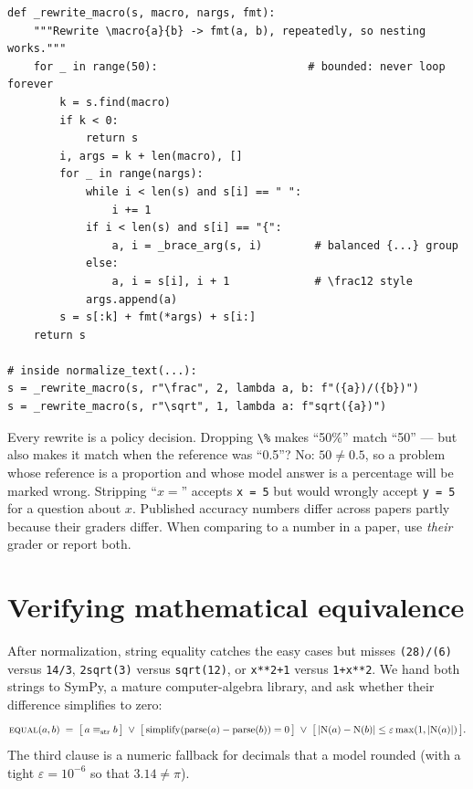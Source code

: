 \begin{lstlisting}[caption={Rewriting macros with brace-delimited arguments (excerpt).},label={lst:eval:rewrite}]
def _rewrite_macro(s, macro, nargs, fmt):
    """Rewrite \macro{a}{b} -> fmt(a, b), repeatedly, so nesting works."""
    for _ in range(50):                       # bounded: never loop forever
        k = s.find(macro)
        if k < 0:
            return s
        i, args = k + len(macro), []
        for _ in range(nargs):
            while i < len(s) and s[i] == " ":
                i += 1
            if i < len(s) and s[i] == "{":
                a, i = _brace_arg(s, i)        # balanced {...} group
            else:
                a, i = s[i], i + 1             # \frac12 style
            args.append(a)
        s = s[:k] + fmt(*args) + s[i:]
    return s

# inside normalize_text(...):
s = _rewrite_macro(s, r"\frac", 2, lambda a, b: f"({a})/({b})")
s = _rewrite_macro(s, r"\sqrt", 1, lambda a: f"sqrt({a})")
\end{lstlisting}

\begin{pitfall}
Every rewrite is a policy decision. Dropping \texttt{\textbackslash\%} makes ``50\%'' match
``50'' --- but also makes it match when the reference was ``0.5''? No: $50 \ne 0.5$, so a
problem whose reference is a proportion and whose model answer is a percentage will be marked
wrong. Stripping ``$x=$'' accepts \texttt{x = 5} but would wrongly accept \texttt{y = 5} for a
question about $x$. Published accuracy numbers differ across papers partly because their graders
differ. When comparing to a number in a paper, use \emph{their} grader or report both.
\end{pitfall}

\section{Verifying mathematical equivalence}\label{sec:eval:sympy}


After normalization, string equality catches the easy cases but misses \texttt{(28)/(6)} versus
\texttt{14/3}, \texttt{2sqrt(3)} versus \texttt{sqrt(12)}, or \texttt{x**2+1} versus
\texttt{1+x**2}. We hand both strings to SymPy, a mature computer-algebra library, and ask
whether their difference simplifies to zero:
\begin{equation}
  \textsc{equal}(a, b) \;=\; \bigl[\, a \equiv_{\text{str}} b \,\bigr] \;\lor\;
  \bigl[\, \mathrm{simplify}(\mathrm{parse}(a) - \mathrm{parse}(b)) = 0 \,\bigr]
  \;\lor\; \bigl[\, |\mathrm{N}(a) - \mathrm{N}(b)| \le \varepsilon \max(1, |\mathrm{N}(a)|) \,\bigr].
  \label{eq:eval:equal}
\end{equation}
The third clause is a numeric fallback for decimals that a model rounded (with a tight
$\varepsilon = 10^{-6}$ so that $3.14 \ne \pi$).

